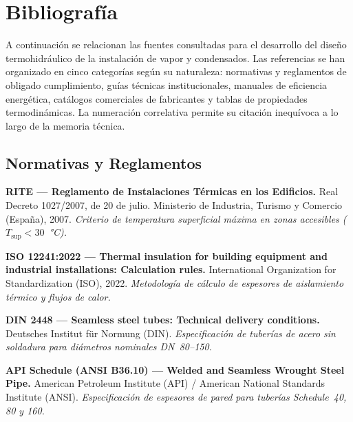
\section{Bibliografía}
\label{sec:bibliografia}

A continuación se relacionan las fuentes consultadas para el desarrollo del diseño termohidráulico de la instalación de vapor y condensados. Las referencias se han organizado en cinco categorías según su naturaleza: normativas y reglamentos de obligado cumplimiento, guías técnicas institucionales, manuales de eficiencia energética, catálogos comerciales de fabricantes y tablas de propiedades termodinámicas. La numeración correlativa permite su citación inequívoca a lo largo de la memoria técnica.

\subsection*{Normativas y Reglamentos}

\begin{enumerate}[label={[\arabic*]}, leftmargin=2em]
	\item \textbf{RITE --- Reglamento de Instalaciones Térmicas en los Edificios.}
	      Real Decreto 1027/2007, de 20 de julio.
	      Ministerio de Industria, Turismo y Comercio (España), 2007.
	      \textit{Criterio de temperatura superficial máxima en zonas accesibles ($T_{\text{sup}} < 30$~°C).}

	\item \textbf{ISO 12241:2022 --- Thermal insulation for building equipment and industrial installations: Calculation rules.}
	      International Organization for Standardization (ISO), 2022.
	      \textit{Metodología de cálculo de espesores de aislamiento térmico y flujos de calor.}

	\item \textbf{DIN 2448 --- Seamless steel tubes: Technical delivery conditions.}
	      Deutsches Institut für Normung (DIN).
	      \textit{Especificación de tuberías de acero sin soldadura para diámetros nominales DN~80--150.}

	\item \textbf{API Schedule (ANSI B36.10) --- Welded and Seamless Wrought Steel Pipe.}
	      American Petroleum Institute (API) / American National Standards Institute (ANSI).
	      \textit{Especificación de espesores de pared para tuberías Schedule~40, 80 y 160.}
\end{enumerate}


